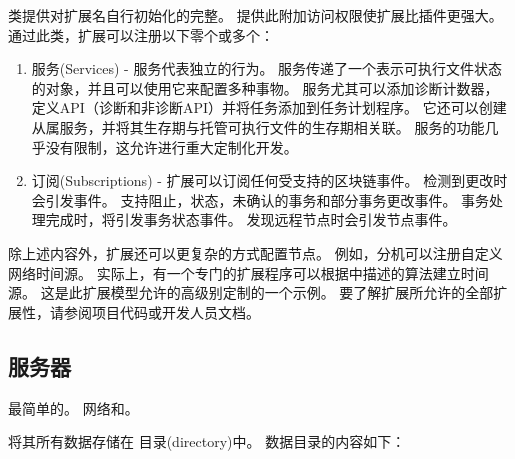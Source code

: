  类提供对扩展名自行初始化的完整。
提供此附加访问权限使扩展比插件更强大。
通过此类，扩展可以注册以下零个或多个：

\begin{enumerate}
	\item{服务(Services) -
		服务代表独立的行为。
		服务传递了一个表示可执行文件状态的对象，并且可以使用它来配置多种事物。
		服务尤其可以添加诊断计数器，定义API（诊断和非诊断API）并将任务添加到任务计划程序。
		它还可以创建从属服务，并将其生存期与托管可执行文件的生存期相关联。
		服务的功能几乎没有限制，这允许进行重大定制化开发。
	}
	\item{订阅(Subscriptions) -
		扩展可以订阅任何受支持的区块链事件。
		检测到更改时会引发事件。
		支持阻止，状态，未确认的事务和部分事务更改事件。
		事务处理完成时，将引发事务状态事件。
		发现远程节点时会引发节点事件。
	}
\end{enumerate}

除上述内容外，扩展还可以更复杂的方式配置节点。
例如，分机可以注册自定义网络时间源。
实际上，有一个专门的扩展程序可以根据中描述的算法建立时间源。
这是此扩展模型允许的高级别定制的一个示例。
要了解扩展所允许的全部扩展性，请参阅项目代码或开发人员文档。

\subsection{服务器}

最简单的。
网络和。

\codenamespace 将其所有数据存储在  目录(directory)中。
数据目录的内容如下：

